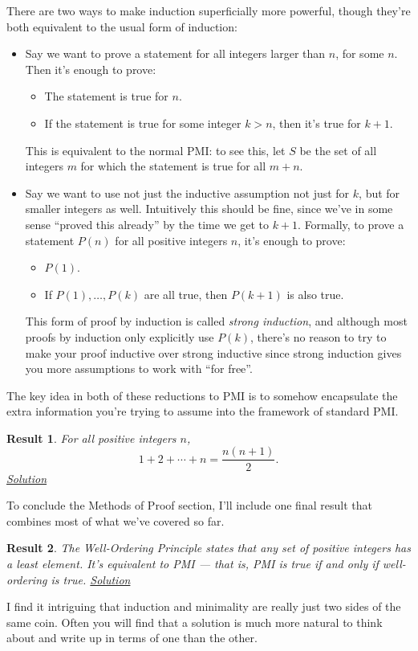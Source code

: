 \documentclass{amsart}
\newtheorem{result}{Result}[subsubsection]
\begin{document}
There are two ways to make induction superficially more powerful, though they're
both equivalent to the usual form of induction:
\begin{itemize}
  \item Say we want to prove a statement for all integers larger than $n$, for
    some $n$. Then it's enough to prove:
    \begin{itemize}
      \item The statement is true for $n$.
      \item If the statement is true for some integer $k>n$, then it's true for
        $k+1$.
    \end{itemize}
    This is equivalent to the normal PMI\@: to see this, let $S$ be the set of
    all integers $m$ for which the statement is true for all $m+n$.
  \item Say we want to use not just the inductive assumption not just for $k$,
    but for smaller integers as well. Intuitively this should be fine, since
    we've in some sense ``proved this already'' by the time we get to $k+1$.
    Formally, to prove a statement $P(n)$ for all positive integers $n$, it's
    enough to prove:
    \begin{itemize}
      \item $P(1)$.
      \item If $P(1),\ldots,P(k)$ are all true, then $P(k+1)$ is also true.
    \end{itemize}
    This form of proof by induction is called \emph{strong induction}, and
    although most proofs by induction only explicitly use $P(k)$, there's no
    reason to try to make your proof inductive over strong inductive since
    strong induction gives you more assumptions to work with ``for free''.
\end{itemize}
The key idea in both of these reductions to PMI is to somehow encapsulate the
extra information you're trying to assume into the framework of standard PMI\@.
\begin{result}\label{r:m:4:1}
  For all positive integers $n$, \[1+2+\cdots+n=\frac{n(n+1)}2.\]
  \hyperlink{s:m:4:1}{Solution}
\end{result}
To conclude the Methods of Proof section, I'll include one final result that
combines most of what we've covered so far.
\begin{result}\label{r:m:4:2}
  The \emph{Well-Ordering Principle} states that any set of positive integers
  has a least element. It's equivalent to PMI --- that is,
  PMI is true if and only if well-ordering is true.
  \hyperlink{s:m:4:2}{Solution}
\end{result}
I find it intriguing that induction and minimality are really just two sides of
the same coin. Often you will find that a solution is much more natural to think
about and write up in terms of one than the other.
\end{document}
